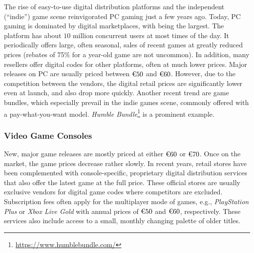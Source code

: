 The rise of easy-to-use digital distribution platforms and the
independent (``indie'') game scene reinvigorated \gls{PC} gaming just a few
years ago. Today, \gls{PC} gaming is dominated by digital marketplaces,
with \steam being the largest. The platform has about $10$ million
concurrent users at most times of the day. It periodically offers large,
often seasonal, sales of recent games at greatly reduced prices (rebates
of 75\% for a year-old game are not uncommon). In addition, many
resellers offer digital codes for other platforms, often at much lower
prices.
Major releases on PC are usually priced between $\text{\texteuro} 50$
and $\text{\texteuro} 60$. However, due to the competition between the
vendors, the digital retail prices are significantly lower even at
launch, and also drop more quickly. Another recent trend are game
bundles, which especially prevail in the indie games scene, commonly
offered with a pay-what-you-want model. \textit{Humble
Bundle}\footnote{\url{https://www.humblebundle.com/}} is a prominent
example.






\subsubsection{Video Game Consoles}

New, major game releases are mostly priced at either
$\text{\texteuro} 60$ or $\text{\texteuro} 70$. Once on the market, the
game prices decrease rather slowly. In recent years, retail stores have
been complemented with console-specific, proprietary digital
distribution services that also offer the latest game at the full price.
These official stores are usually exclusive vendors for digital game
codes where competitors are excluded.
Subscription fees often apply for the multiplayer mode of games, e.g.,
\textit{PlayStation Plus} or \textit{Xbox Live Gold} with annual prices
of $\text{\texteuro} 50$ and $\text{\texteuro} 60$, respectively. These
services also include access to a small, monthly changing palette of
older titles.

